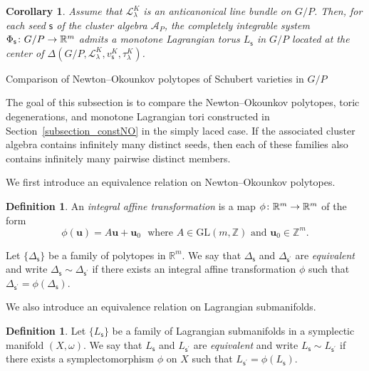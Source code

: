 \documentclass[11pt]{amsart}
\makeatletter
\def\subsection{\@startsection{subsection}{2}%
  \z@{-.8\linespacing\@plus-.3\linespacing}{.3\linespacing\@plus.2\linespacing}%
  {\normalfont\bfseries}}
\newcommand{\R}{\mathbb{R}}
\newcommand{\Z}{\mathbb{Z}}
\def\mcal{\mathcal}
\numberwithin{equation}{section}
\theoremstyle{plain}
\newtheorem{corollary}[theorem]{Corollary}
\theoremstyle{definition}
\newtheorem{definition}[theorem]{Definition}
\def\to{\mathchoice{\longrightarrow}{\rightarrow}{\rightarrow}{\rightarrow}}
\numberwithin{equation}{section}
\newcommand{\seed}{\mathsf{s}}
\makeatother
\begin{document}
\begin{corollary}\label{cor_monotoneLagtoriconst}
Assume that $\mcal{L}^K_\lambda$ is an anticanonical line bundle on $G/P$. Then, for each seed $\seed$ of the cluster algebra $\mcal{A}_P$, the completely integrable system $\Phi_\seed \colon G/P \to \R^{m}$ admits a monotone Lagrangian torus $L_\seed$ in $G/P$ located at the center of $\Delta(G/P, \mcal{L}^K_\lambda, v^K_{\seed}, \tau^K_\lambda)$.
\end{corollary}




\subsection{Comparison of Newton--Okounkov polytopes of Schubert varieties in $G/P$}

The goal of this subsection is to compare the Newton--Okounkov polytopes, toric degenerations, and monotone Lagrangian tori constructed in Section~\ref{subsection_constNO} in the simply laced case. If the associated cluster algebra contains infinitely many distinct seeds, then each of these families also contains infinitely many pairwise distinct members.

We first introduce an equivalence relation on Newton--Okounkov polytopes.

\begin{definition}
An \emph{integral affine transformation} is a map $\phi \colon \R^m \to \R^m$ of the form
$$
\phi (\mathbf{u} ) = A \mathbf{u} + \mathbf{u}_0 \,\, \mbox{ where $A \in \mathrm{GL}(m, \Z)$ and $\mathbf{u}_0 \in \Z^m$}.
$$

Let $\{ \Delta_\seed \}$ be a family of polytopes in $\R^m$. We say that
$\Delta_\seed$ and $\Delta_{\seed^\prime}$ are \emph{equivalent} and write $\Delta_\seed \sim \Delta_{\seed^\prime}$ if there exists an integral affine transformation $\phi$ such that $\Delta_{\seed^\prime} = \phi (\Delta_\seed)$.
\end{definition}

We also introduce an equivalence relation on Lagrangian submanifolds.

\begin{definition}
Let $\{ L_\seed \}$ be a family of Lagrangian submanifolds in a symplectic manifold $(X, \omega)$. We say that $L_\seed$ and $L_{\seed^\prime}$ are \emph{equivalent} and write $L_\seed \sim L_{\seed^\prime}$ if there exists a symplectomorphism $\phi$ on $X$ such that $L_{\seed^\prime} = \phi (L_\seed)$. \end{definition}
\end{document}
